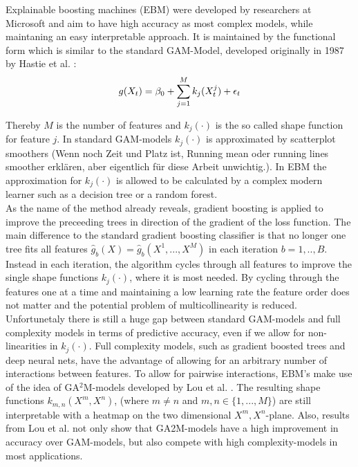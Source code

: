 \documentclass[12pt,titlepage]{article}
\begin{document}
Explainable boosting machines (EBM) were developed by researchers at Microsoft \cite{interpretml} and aim to have high accuracy as most complex models, while maintaning an easy interpretable approach. It is maintained by the functional form which is similar to the standard GAM-Model, developed originally in 1987 by Hastie et al. \cite{gam}: \\

\begin{equation} \label{gam}
    g(X_{t}) = \beta_{0} + \sum_{j=1}^{M} k_{j}(X^{j}_{t}) + \epsilon_{t} \\
\end{equation}

Thereby $M$ is the number of features and $k_{j}(\cdot)$ is the so called shape function for feature $j$. In standard GAM-models $k_{j}(\cdot)$ is approximated by scatterplot smoothers (Wenn noch Zeit und Platz ist, Running mean oder running lines smoother erklären, aber eigentlich für diese Arbeit unwichtig.). In EBM the approximation for $k_{j}(\cdot)$ is allowed to be calculated by a complex modern learner such as a decision tree or a random forest. \\
As the name of the method already reveals, gradient boosting is applied to improve the preceeding trees in direction of the gradient of the loss function. The main difference to the standard gradient boosting classifier is that no longer one tree fits all features $\hat{g}_{b}(X)=\hat{g}_{b}(X^{1}, ..., X^{M})$ in each iteration $b=1,..,B$. Instead in each iteration, the algorithm cycles through all features to improve the single shape functions $k_{j}(\cdot)$, where it is most needed. By cycling through the features one at a time and maintaining a low learning rate the feature order does not matter and the potential problem of multicollinearity is reduced. \\
Unfortunetaly there is still a huge gap between standard GAM-models and full complexity models in terms of predictive accuracy, even if we allow for non-linearities in $k_{j}(\cdot)$. Full complexity models, such as gradient boosted trees and deep neural nets, have the advantage of allowing for an arbitrary number of interactions between features. To allow for pairwise interactions, EBM's make use of the idea of GA$^{2}$M-models developed by Lou et al. \cite{ga2m}. The resulting shape functions $k_{m,n}(X^{m}, X^{n})$, (where $m\neq n$ and $m,n \in \{1,...,M\}$) are still interpretable with a heatmap on the two dimensional $X^{m}, X^{n}$-plane. Also, results from Lou et al. not only show that GA2M-models have a high improvement in accuracy over GAM-models, but also compete with high complexity-models in most applications. \\
\end{document}
